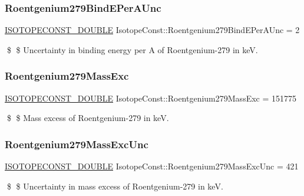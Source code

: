 \subsubsection{\texorpdfstring{Roentgenium279\+Bind\+E\+Per\+A\+Unc}{Roentgenium279BindEPerAUnc}}
{\footnotesize\ttfamily \mbox{\hyperlink{group___isotope_const-_macros_ga8f45a7272ce02c0b4c65c44636ed719a}{I\+S\+O\+T\+O\+P\+E\+C\+O\+N\+S\+T\+\_\+\+D\+O\+U\+B\+LE}} Isotope\+Const\+::\+Roentgenium279\+Bind\+E\+Per\+A\+Unc = 2}

\$ \$ Uncertainty in binding energy per A of Roentgenium-\/279 in keV. \mbox{\label{group___isotope_const-_roentgenium-_rg279_gadf9d5041893c18410be68b56fbc27855}} 
\subsubsection{\texorpdfstring{Roentgenium279\+Mass\+Exc}{Roentgenium279MassExc}}
{\footnotesize\ttfamily \mbox{\hyperlink{group___isotope_const-_macros_ga8f45a7272ce02c0b4c65c44636ed719a}{I\+S\+O\+T\+O\+P\+E\+C\+O\+N\+S\+T\+\_\+\+D\+O\+U\+B\+LE}} Isotope\+Const\+::\+Roentgenium279\+Mass\+Exc = 151775}

\$ \$ Mass excess of Roentgenium-\/279 in keV. \mbox{\label{group___isotope_const-_roentgenium-_rg279_ga7acc9202185d922483a6a576d5187379}} 
\subsubsection{\texorpdfstring{Roentgenium279\+Mass\+Exc\+Unc}{Roentgenium279MassExcUnc}}
{\footnotesize\ttfamily \mbox{\hyperlink{group___isotope_const-_macros_ga8f45a7272ce02c0b4c65c44636ed719a}{I\+S\+O\+T\+O\+P\+E\+C\+O\+N\+S\+T\+\_\+\+D\+O\+U\+B\+LE}} Isotope\+Const\+::\+Roentgenium279\+Mass\+Exc\+Unc = 421}

\$ \$ Uncertainty in mass excess of Roentgenium-\/279 in keV. \mbox{\label{group___isotope_const-_roentgenium-_rg279_ga5a6f053a16e6e5560848416631af70b6}} 
